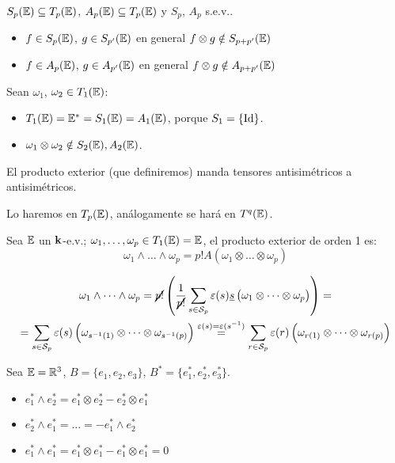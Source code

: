 \begin{obs}
	$S_p(\mathbb{E}) \subseteq T_p(\mathbb{E})$, $A_p(\mathbb{E}) \subseteq T_p(\mathbb{E})$ y $S_p$, $A_p$ s.e.v..
	\begin{itemize}
	    \item $f \in S_p(\mathbb{E})$, $g \in S_{p'}(\mathbb{E})$ en general $f \otimes g \notin S_{p+p'}(\mathbb{E})$
	    \item $f \in A_p(\mathbb{E})$, $g \in A_{p'}(\mathbb{E})$ en general $f \otimes g \notin A_{p+p'}(\mathbb{E})$
	\end{itemize}
\end{obs}
\begin{example}
    Sean $\omega_1$, $\omega_2 \in T_1(\mathbb{E})$:
	\begin{itemize}
		\item $T_1(\mathbb{E}) = \mathbb{E}^* = S_1(\mathbb{E}) = A_1(\mathbb{E})$, porque $S_1 = \{\operatorname{Id}\}$.
		\item $\omega_1 \otimes \omega_2 \notin S_2(\mathbb{E}), A_2(\mathbb{E})$.
	\end{itemize}
\end{example}
\begin{obs}
	El producto exterior (que definiremos) manda tensores antisimétricos a antisimétricos.
\end{obs}
\begin{obs}
	Lo haremos en $T_p(\mathbb{E})$, análogamente se hará en $T^q(\mathbb{E})$.
\end{obs}
\begin{defi} \label{pr_ext}
	Sea $\mathbb{E}$ un $\mathbf{k}$-e.v.; $\omega_1, \dots, \omega_p \in T_1(\mathbb{E}) = \mathbb{E}$, el producto exterior de orden 1 es:
	\[
		\omega_1 \wedge \dots \wedge \omega_p = p! A(\omega_1 \otimes \dots \otimes \omega_p)
	\]
\end{defi}
\begin{obs} \label{obs_pr_ext}
	\begin{gather*}
		\omega_1 \wedge \dots \wedge \omega_p = \cancel{p!}  \left( \frac{1}{\cancel{p!}}\sum_{s \in \mathcal{S}_p} \varepsilon(s)
		\underline{s}\left(\omega_1 \otimes \dots \otimes \omega_p \right) \right) = \\
		= \sum_{s \in \mathcal{S}_p} \varepsilon(s) \left( \omega_{s^{-1}(1)} \otimes \dots \otimes \omega_{s^{-1}(p)}
		\right) \stackrel{\varepsilon(s) = \varepsilon(s^{-1})}{=} \sum_{r \in \mathcal{S}_p}
		\varepsilon(r) \left( \omega_{r(1)} \otimes \dots \otimes \omega_{r(p)} \right)
	\end{gather*}
\end{obs}
\begin{example}
    Sea $\mathbb{E} = \mathbb{R}^3$, $B = \{e_1, e_2, e_3\}$, $B^* = \{ e_1^*, e_2^*, e_3^*\}$.
    \begin{itemize}
        \item $e_1^* \wedge e_2^* = e_1^* \otimes e_2^* - e_2^* \otimes e_1^*$
        \item $e_2^* \wedge e_1^* = \dots = -e_1^* \wedge e_2^*$
        \item $e_1^* \wedge e_1^* = e_1^* \otimes e_1^* - e_1^* \otimes e_1^* = 0$
    \end{itemize}
\end{example}
